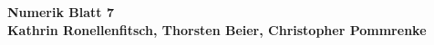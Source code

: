 \documentclass[10pt,oneside,a4paper]{scrartcl}
\begin{document}
    \begin{center}
        \huge %
        \bfseries %
        \sffamily %
        Numerik Blatt 7\\[1em]
        \normalsize
        Kathrin Ronellenfitsch, Thorsten Beier, Christopher Pommrenke
    \end{center}

    
\end{document}

